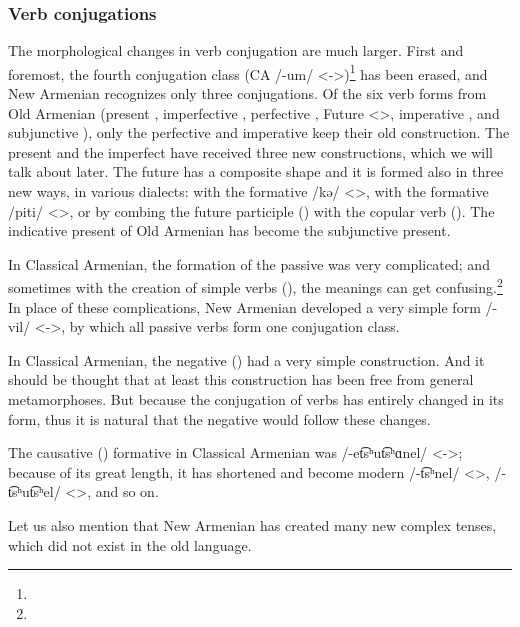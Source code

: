 \subsubsection{Verb conjugations}
The morphological changes in verb conjugation are much larger. First and foremost, the fourth conjugation class (CA /-um/ <->)\footnote{} has been erased, and New Armenian recognizes only three conjugations. Of the six verb forms from Old Armenian (present , imperfective , perfective , Future <>, imperative , and subjunctive ), only the perfective and imperative keep their old construction. The present and the imperfect have received three new constructions, which we will talk about later. The future has a composite shape and it is formed also in three new ways, in various dialects: with the formative /kə/ <>, with the formative /piti/ <>, or by combing the future participle () with the copular verb (). The indicative present of Old Armenian has become the subjunctive present. 

In Classical Armenian, the formation of the passive was very complicated; and sometimes with the creation of simple verbs (), the meanings can get confusing.\footnote{} In place of these complications, New Armenian developed a very simple form /-vil/ <->, by which all passive verbs form one conjugation class.

In Classical Armenian, the negative () had a very simple construction. And it should be thought that at least this construction has been free from general metamorphoses. But because the conjugation of verbs has entirely changed in its form, thus it is natural that the negative would follow these changes. 

The causative () formative in Classical Armenian was /-et͡sʰut͡sʰɑnel/ <->; because of its great length, it has shortened and become modern /-t͡sʰnel/ <>, /-t͡sʰut͡sʰel/ <>, and so on. 

Let us also mention that New Armenian has created many new complex tenses, which did not exist in the old language.

